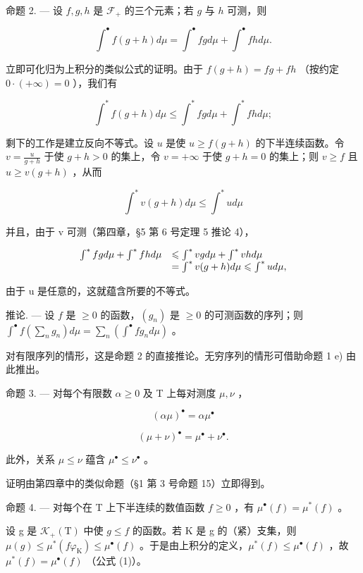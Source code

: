 命题 2. --- 设 \(f,g,h\) 是 \(\mathcal{F}_{+}\) 的三个元素；若 \(g\) 与 \(h\) 可测，则

\[
\int^ {\bullet} f (g + h) d \mu = \int^ {\bullet} f g d \mu + \int^ {\bullet} f h d \mu .\tag{2}
\]

立即可化归为上积分的类似公式的证明。由于 \(f(g + h) = fg + fh\) （按约定 \(0 \cdot (+\infty) = 0\) ），我们有

\[
\int^ {*} f (g + h) d \mu \leqslant \int^ {*} f g d \mu + \int^ {*} f h d \mu ;
\]

剩下的工作是建立反向不等式。设 \(u\) 是使 \(u \geqslant f(g + h)\) 的下半连续函数。令 \(v = \frac{u}{g + h}\) 于使 \(g + h > 0\) 的集上，令 \(v = +\infty\) 于使 \(g + h = 0\) 的集上；则 \(v \geqslant f\) 且 \(u \geqslant v(g + h)\) ，从而

\[
\int^ {*} v (g + h) d \mu \leqslant \int^ {*} u d \mu
\]

并且，由于 v 可测（第四章，§5 第 6 号定理 5 推论 4），

\[
\begin{array}{r l} \int^ {*} f g d \mu + \int^ {*} f h d \mu & \leqslant \int^ {*} v g d \mu + \int^ {*} v h d \mu \\ & = \int^ {*} v (g + h) d \mu \leqslant \int^ {*} u d \mu , \end{array}
\]

由于 u 是任意的，这就蕴含所要的不等式。

推论. --- 设 \(f\) 是 \(\geqslant 0\) 的函数，\((g_n)\) 是 \(\geqslant 0\) 的可测函数的序列；则 \(\int^{\bullet} f\left(\sum_{n} g_n\right) d\mu = \sum_{n} \left(\int^{\bullet} fg_n d\mu\right)\) 。

对有限序列的情形，这是命题 2 的直接推论。无穷序列的情形可借助命题 1 e) 由此推出。

命题 3. --- 对每个有限数 \(\alpha \geqslant 0\) 及 T 上每对测度 \(\mu, \nu\) ，

\[
(\alpha \mu) ^ {\bullet} = \alpha \mu^ {\bullet}
\]

\[
(\mu + \nu) ^ {\bullet} = \mu^ {\bullet} + \nu^ {\bullet}.
\]

此外，关系 \(\mu \leqslant \nu\) 蕴含 \(\mu^{\bullet} \leqslant \nu^{\bullet}\) 。

证明由第四章中的类似命题（§1 第 3 号命题 15）立即得到。

命题 4. --- 对每个在 T 上下半连续的数值函数 \(f \geqslant 0\) ，有 \(\mu^{\bullet}(f) = \mu^{*}(f)\) 。

设 g 是 \(\mathcal{K}_{+}(\mathrm{T})\) 中使 \(g \leqslant f\) 的函数。若 K 是 g 的（紧）支集，则 \(\mu(g) \leqslant \mu^{*}(f\varphi_{\mathrm{K}}) \leqslant \mu^{\bullet}(f)\) 。于是由上积分的定义，\(\mu^{*}(f) \leqslant \mu^{\bullet}(f)\) ，故 \(\mu^{*}(f) = \mu^{\bullet}(f)\) （公式 (1)）。

